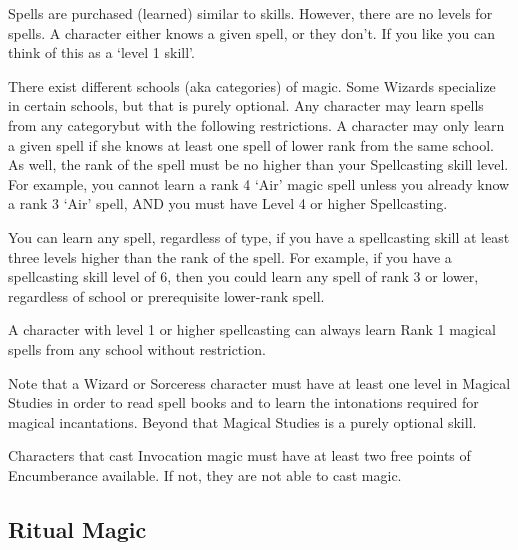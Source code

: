 \documentclass[twoside]{book}
\begin{document}
    {  
      Spells are purchased (learned) similar to skills.
               However, there are no levels for spells. A character
               either knows a given spell, or they don't. If you
               like you can think of this as a `level 1
               skill'. 
    }
  
    {  
      There exist different schools (aka categories) of
               magic. Some Wizards specialize in certain schools, but
               that is purely optional. Any character may learn spells
               from any categorybut with the following
               restrictions. A character may only learn a given spell if
               she knows at least one spell of lower rank from the same
               school. As well, the rank of the spell must be no higher
               than your Spellcasting skill level. For example, you
               cannot learn a rank 4 `Air' magic spell unless
               you already know a rank 3 `Air' spell, AND you
               must have Level 4 or higher Spellcasting. 
    }
  
    {  
      You can learn any spell, regardless of type, if you
               have a spellcasting skill at least three levels higher
               than the rank of the spell. For example, if you have a
               spellcasting skill level of 6, then you could learn any
               spell of rank 3 or lower, regardless of school or
               prerequisite lower-rank spell. 
    }
  
    {  
      A character with level 1 or higher spellcasting can
               always learn Rank 1 magical spells from any school without
               restriction. 
    }
  
    {  
      Note that a Wizard or Sorceress character must have
               at least one level in Magical Studies in order to read
               spell books and to learn the intonations required for
               magical incantations. Beyond that Magical Studies is a
               purely optional skill. 
    }
  
    {  
      Characters that cast Invocation magic must have at
               least two free points of Encumberance available. If not,
               they are not able to cast magic. 
    }
  
    

\subsection{Ritual Magic}
    
\end{document}
